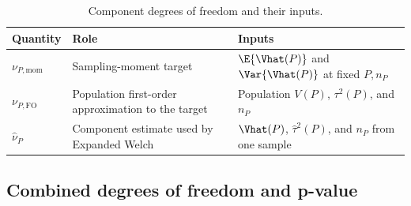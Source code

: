 \begin{table}[htbp]
\centering
\caption{Component degrees of freedom and their inputs.}
\label{tab:component-df-roles}
\thesistableformat
\begin{tabularx}{\textwidth}{@{}l>{\raggedright\arraybackslash}X>{\raggedright\arraybackslash}X@{}}
\toprule
\textbf{Quantity} & \textbf{Role} & \textbf{Inputs}\\
\midrule
\(\nu_{P,\mathrm{mom}}\) & Sampling-moment target &
\(\E\{\Vhat(P)\}\) and \(\Var\{\Vhat(P)\}\) at fixed \(P,n_P\)\\
\addlinespace
\(\nu_{P,\mathrm{FO}}\) & Population first-order approximation to the target &
Population \(V(P)\), \(\tau^2(P)\), and \(n_P\)\\
\addlinespace
\(\widehat\nu_P\) & Component estimate used by Expanded Welch &
\(\Vhat(P)\), \(\widehat\tau^2(P)\), and \(n_P\) from one sample\\
\bottomrule
\end{tabularx}
\end{table}

\subsection{Combined degrees of freedom and p-value}

